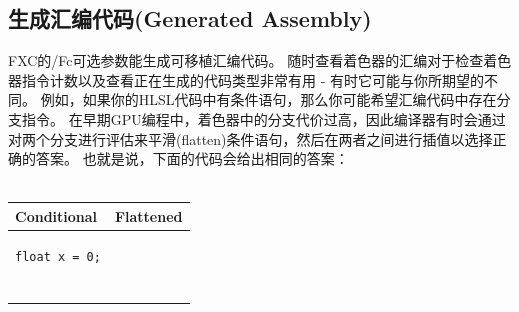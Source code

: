 \documentclass[11pt,a4paper,oldfontcommands]{memoir}
\begin{document}
{\subsection{生成汇编代码(Generated Assembly)}
\begin{flushleft}
FXC的/Fc可选参数能生成可移植汇编代码。 随时查看着色器的汇编对于检查着色器指令计数以及查看正在生成的代码类型非常有用 - 有时它可能与你所期望的不同。 例如，如果你的HLSL代码中有条件语句，那么你可能希望汇编代码中存在分支指令。 在早期GPU编程中，着色器中的分支代价过高，因此编译器有时会通过对两个分支进行评估来平滑(flatten)条件语句，然后在两者之间进行插值以选择正确的答案。 也就是说，下面的代码会给出相同的答案：\\
~\\
\begin{tabular}{|p{20em}|p{20em}|} 
\hline
Conditional & Flattened\\ 
\hline
\begin{lstlisting}
float x = 0;


\end{lstlisting}
\end{tabular}
\end{flushleft}}
\end{document}
